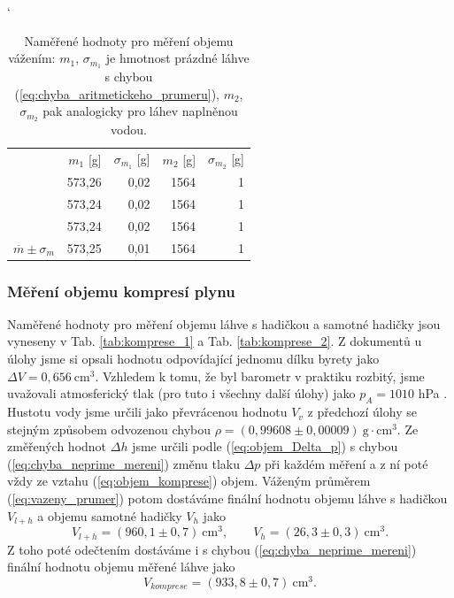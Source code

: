 \documentclass[english]{article}
\newcommand{\unit}[1]{\mathrm{#1}}
\begin{document}
\begin{table}[htbp]
\catcode` %
  \centering
  
    \begin{tabular}{|r|r|r|r|r|}
\cline{2-5}    \multicolumn{1}{r|}{} & $m_1$ [g] & $\sigma_{m_1}$ [g] & $m_2$ [g] & $\sigma_{m_2}$ [g] \bigstrut\\
\cline{2-5}    \multicolumn{1}{r|}{} & 573,26 & 0,02  & 1564  & 1 \bigstrut\\
\cline{2-5}    \multicolumn{1}{r|}{} & 573,24 & 0,02  & 1564  & 1 \bigstrut\\
\cline{2-5}    \multicolumn{1}{r|}{} & 573,24 & 0,02  & 1564  & 1 \bigstrut\\
    \hline
    $\overline{m}\pm \sigma_{m}$ & 573,25 & 0,01  & 1564  & 1 \bigstrut\\
    \hline
    \end{tabular}%

 \caption{Naměřené hodnoty pro měření objemu vážením: $m_1$, $\sigma_{m_1}$ je hmotnost prázdné láhve s chybou (\ref{eq:chyba_aritmetickeho_prumeru}),  $m_2$, $\sigma_{m_2}$ pak analogicky pro láhev naplněnou vodou.}
 \label{tab:hmotnosti}%
\end{table}%

	
					
			\subsubsection{Měření objemu kompresí plynu}
					Naměřené hodnoty pro měření objemu láhve s hadičkou a samotné hadičky jsou vyneseny v Tab. \ref{tab:komprese_1} a Tab. \ref{tab:komprese_2}. Z dokumentů u úlohy jsme si opsali hodnotu odpovídající jednomu dílku byrety jako $\Delta V =0,656\unit{\ cm^3}.$ Vzhledem k tomu, že byl barometr v praktiku rozbitý, jsme uvažovali atmosferický tlak (pro tuto i všechny další úlohy) jako $p_A = 1010$ hPa \cite{bib:tlak}. Hustotu vody jsme určili jako převrácenou hodnotu $V_v$ z předchozí úlohy se stejným způsobem odvozenou chybou $\rho = (0,99608\pm0,00009) \unit{\ g\cdot cm^3}$. Ze změřených hodnot $\Delta h$ jsme určili podle (\ref{eq:objem_Delta_p}) s chybou (\ref{eq:chyba_neprime_mereni}) změnu tlaku $\Delta p$ při každém měření a z ní poté vždy ze vztahu (\ref{eq:objem_komprese}) objem.  Váženým průměrem (\ref{eq:vazeny_prumer}) potom dostáváme finální hodnotu objemu láhve s hadičkou $V_{l+h}$ a objemu samotné hadičky $V_h$ jako
				   \begin{equation}
				   		V_{l+h} = (960,1\pm0,7)\unit{\ cm^3}, \qquad V_{h} = (26,3\pm0,3)\unit{\ cm^3}.
				   \end{equation}					 
				   Z toho poté odečtením dostáváme i s chybou (\ref{eq:chyba_neprime_mereni}) finální hodnotu objemu měřené láhve jako
				   \begin{equation}
				   		V_{komprese} = (933,8\pm0,7)\unit{\ cm^3}.
				   \end{equation}
					 
\end{document}
